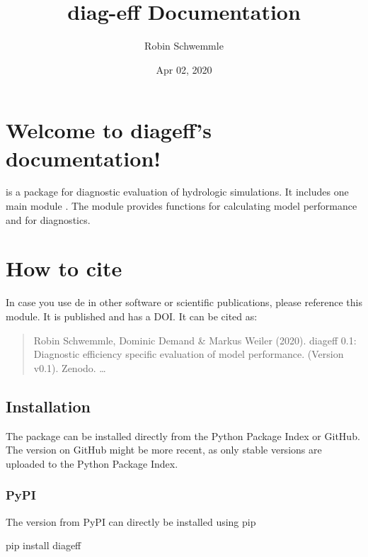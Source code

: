 \documentclass[letterpaper,10pt,english]{sphinxmanual}
\title{diag-eff Documentation}
\date{Apr 02, 2020}
\author{Robin Schwemmle}
\begin{document}
\pagestyle{empty}
\sphinxmaketitle
\pagestyle{plain}
\sphinxtableofcontents
\pagestyle{normal}
\label{\detokenize{index::doc}}



\chapter{Welcome to diag\sphinxhyphen{}eff’s documentation!}
\label{\detokenize{index:welcome-to-diag-eff-s-documentation}}
 is a package for diagnostic evaluation of hydrologic simulations. It
includes one main module . The module provides functions for calculating
model performance and for diagnostics.


\chapter{How to cite}
\label{\detokenize{index:how-to-cite}}
In case you use de in other software or scientific publications,
please reference this module. It is published and has a DOI. It can be cited
as:
\begin{quote}

Robin Schwemmle, Dominic Demand \& Markus Weiler (2020). diag\sphinxhyphen{}eff 0.1:
Diagnostic efficiency \textendash{} specific evaluation of model performance.
(Version v0.1). Zenodo. …
\end{quote}


\section{Installation}
\label{\detokenize{install:installation}}\label{\detokenize{install::doc}}
The package can be installed directly from the Python Package Index or GitHub.
The version on GitHub might be more recent, as only stable versions are
uploaded to the Python Package Index.


\subsection{PyPI}
\label{\detokenize{install:pypi}}
The version from PyPI can directly be installed using pip

\begin{sphinxVerbatim}[commandchars=\\\{\}]
pip install diag\PYGZhy{}eff
\end{sphinxVerbatim}
\end{document}
